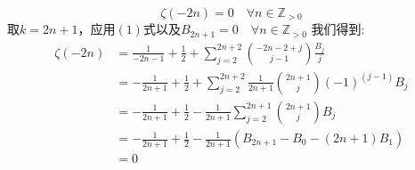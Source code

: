 \documentclass[a4paper,12pt]{ctexart}
\newenvironment{prooff}{{\noindent\it\textcolor{black}{Proof}:}\quad}{\par}
\theoremstyle{definition}
\begin{document}
$$\zeta(-2n)=0\quad \forall n\in\mathbb{Z}_{>0}$$
\begin{prooff}
    取$k=2n+1$，应用$(1)$式以及$B_{2n+1}=0 \quad \forall n\in \mathbb{Z}_{>0}$
    我们得到:
    \begin{align*}
        \zeta(-2n) & =\frac{1}{-2n-1}+\frac{1}{2}+\sum_{j=2}^{2n+2}\binom{-2n-2+j}{j-1}\frac{B_j}{j}            \\
                   & =-\frac{1}{2n+1}+\frac{1}{2}+\sum_{j=2}^{2n+2}\frac{1}{2n+1}\binom{2n+1}{j}(-1)^{(j-1)}B_j \\
                   & =-\frac{1}{2n+1}+\frac{1}{2}-\frac{1}{2n+1}\sum_{j=2}^{2n+1}\binom{2n+1}{j}B_j             \\
                   & =-\frac{1}{2n+1}+\frac{1}{2}-\frac{1}{2n+1}(B_{2n+1}-B_0-(2n+1)B_1)                        \\
                   & =0
    \end{align*}


\end{prooff}
\end{document}
